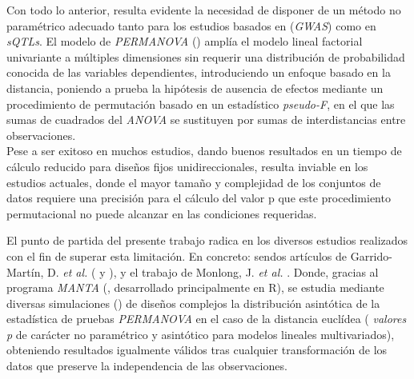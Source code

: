 \documentclass[IB,BIB]{TFUOC}%
\let\oldgls=\gls
\renewcommand{\gls}[1]{{\hypersetup{linkcolor=[RGB]{0,0,0}}
  \oldgls{#1}}}
\begin{document}
Con todo lo anterior, resulta evidente la necesidad de disponer de un método no paramétrico adecuado tanto para los estudios basados en (\textit{GWAS}) como en \textit{sQTLs}. El modelo de \textit{PERMANOVA} (\cite{anderson_new_2001}) amplía el modelo lineal factorial univariante a múltiples dimensiones sin requerir una distribución de probabilidad conocida de las variables dependientes, introduciendo un enfoque basado en la distancia, poniendo a prueba la hipótesis de ausencia de efectos mediante un procedimiento de permutación basado en un estadístico \hspace{-.5em}\textit{\gls{pseudo-F}}, en el que las sumas de cuadrados del \textit{ANOVA} se sustituyen por sumas de interdistancias entre observaciones.\\
Pese a ser exitoso en muchos estudios, dando buenos resultados en un tiempo de cálculo reducido para diseños fijos unidireccionales, resulta inviable en los estudios actuales, donde el mayor tamaño y complejidad de los conjuntos de datos requiere una precisión para el cálculo del valor p que este procedimiento permutacional no puede alcanzar en las condiciones requeridas.

El punto de partida del presente trabajo radica en los diversos estudios realizados con el fin de superar esta limitación. En concreto: sendos artículos de Garrido-Martín, D. \textit{et al.} (\cite{garrido-martin_fast_2022} y \cite{garrido-martin_identification_2021}), y el trabajo de Monlong, J. \textit{et al.} \cite{monlong_identification_2014}. Donde, gracias al programa \hspace{-.5em}\textit{\gls{MANTA}} (\cite{garrido-martin_manta_2023}, desarrollado principalmente en R), se estudia mediante diversas simulaciones (\cite{garrido-martin_manta-sim_2022}) de diseños complejos la distribución asintótica de la estadística de pruebas \textit{PERMANOVA} en el caso de la distancia euclídea (\hspace{-.5em}\textit{\gls{valores p}} de carácter no paramétrico y asintótico para modelos lineales multivariados), obteniendo resultados igualmente válidos tras cualquier transformación de los datos que preserve la independencia de las observaciones.

\end{document}
